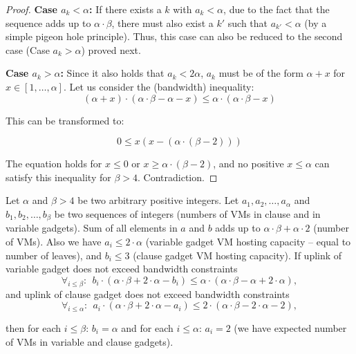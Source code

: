 \documentclass[9pt]{sigcomm-alternate}
\newcommand{\maciek}[1]{\textcolor{brown}{maciek: #1}}
\newcommand{\clauses}{\alpha}
\newcommand{\variables}{\beta}
\begin{document}
\begin{appendix}
\begin{proof}
\textbf{Case $a_k<\clauses$:} If there exists a $k$ with $a_k<\clauses$,
due to the fact that the sequence adds up to $\clauses \cdot \variables$,
there must also exist a $k'$ such that $a_{k'}<\clauses$ (by a simple
pigeon hole principle). Thus, this case can
also be reduced to the second case (Case $a_k>\clauses$) proved
next.

\textbf{Case $a_k>\clauses$:} Since it also holds that $a_k < 2\clauses$,
$a_k$ must be of the form $\clauses + x$ for $x \in [1, \ldots, \clauses]$.
Let us consider the (bandwidth) inequality:
$$ (\clauses + x) \cdot (\clauses \cdot \variables - \clauses - x) \leq \clauses \cdot (\clauses \cdot \variables - x) $$

This can be transformed to:

$$ 0 \leq x(x - (\clauses \cdot (\variables - 2))) $$

The equation holds for $x \leq 0$ or $x \geq \clauses \cdot (\variables - 2)$,
and no
positive $x \leq \clauses$ can satisfy this inequality for $\variables > 4$. Contradiction.
\end{proof}
\begin{lemma}\label{lem:bandwidth-lemma-extended}
  Let $\clauses$ and $\variables > 4$ be two arbitrary positive integers. Let $a_1, a_2, \ldots,
  a_{\clauses}$ and $b_1, b_2, \ldots,
  b_{\variables}$ be two sequences of integers (numbers of VMs in clause and in variable gadgets). Sum of all elements in $a$ and $b$ adds up to
  $\clauses \cdot \variables + \clauses \cdot 2$ (number of VMs). Also
  we have $a_i \leq 2 \cdot \clauses$
  (variable gadget VM hosting capacity -- equal to number of leaves),
  and $b_i \leq 3$ (clause gadget VM hosting capacity). If uplink of variable gadget does not exceed bandwidth constraints
  $$ \forall_{i\leq\variables}:~~ b_i \cdot (\clauses \cdot \variables
  + 2\cdot \clauses- b_i) \leq \clauses \cdot (\clauses \cdot \variables -
  \clauses + 2 \cdot \clauses), $$
and uplink of clause gadget does not exceed bandwidth constraints
$$ \forall_{i\leq\clauses}:~~ a_i \cdot (\clauses \cdot \variables + 2 \cdot \clauses - a_i) \leq 2 \cdot (\clauses \cdot \variables -
  2 \cdot \clauses - 2), $$

\noindent  then for each $i\leq \variables$: $b_i = \clauses$ and for
each $i\leq\clauses$: $a_i = 2$ (we have expected number of VMs in variable and clause gadgets).
\end{lemma}



\end{appendix}
\end{document}
